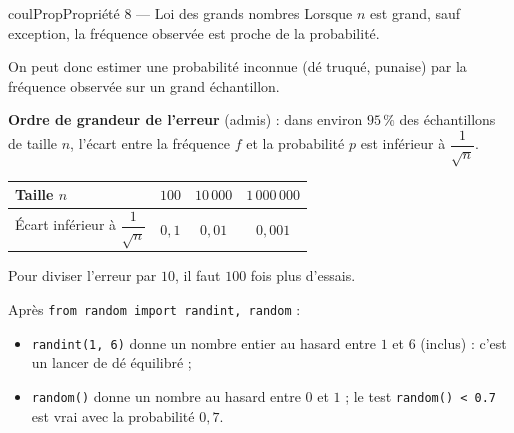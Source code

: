 \documentclass[11pt,a4paper]{article}
\makeatletter
\newcounter{lycee@signet}
\newcommand{\signet}[3][]{\stepcounter{lycee@signet}%
  \edef\lycee@dest{\if\relax\detokenize{#1}\relax
    signet.\arabic{lycee@signet}\else#1\fi}%
  \hypertarget{\lycee@dest}{}\bookmark[level=#2,dest=\lycee@dest]{#3}}
\newenvironment{proprietebox}[1][Propriété]%
  {\begin{boitecours}[phantom={\signet{2}{#1}}]{coulProp}{#1}}{\end{boitecours}}
\makeatother
\begin{document}
\begin{proprietebox}[Propriété 8 --- Loi des grands nombres]
Lorsque $n$ est grand, sauf exception, la fréquence observée est proche de la
probabilité.

\smallskip
On peut donc estimer une probabilité inconnue (dé truqué, punaise) par la fréquence
observée sur un grand échantillon.

\smallskip
\textbf{Ordre de grandeur de l'erreur} (admis) : dans environ $95\,\%$ des
échantillons de taille $n$, l'écart entre la fréquence $f$ et la probabilité $p$ est
inférieur à $\dfrac{1}{\sqrt{n}}$.
\begin{center}
\renewcommand{\arraystretch}{2.4}
\begin{tabular}{|l|c|c|c|}
\hline
Taille $n$ & $100$ & $10\,000$ & $1\,000\,000$ \\
\hline
Écart inférieur à $\dfrac{1}{\sqrt{n}}$ & $0{,}1$ & $0{,}01$ & $0{,}001$ \\
\hline
\end{tabular}
\end{center}
Pour diviser l'erreur par $10$, il faut $100$ fois plus d'essais.
\end{proprietebox}

\begin{remarquebox}[En Python]
Après \texttt{from random import randint, random} :
\begin{itemize}
  \item \texttt{randint(1, 6)} donne un nombre entier au hasard entre $1$ et $6$
    (inclus) : c'est un lancer de dé équilibré ;
  \item \texttt{random()} donne un nombre au hasard entre $0$ et $1$ ; le test
    \texttt{random() < 0.7} est vrai avec la probabilité $0{,}7$.
\end{itemize}
\end{remarquebox}
\end{document}
